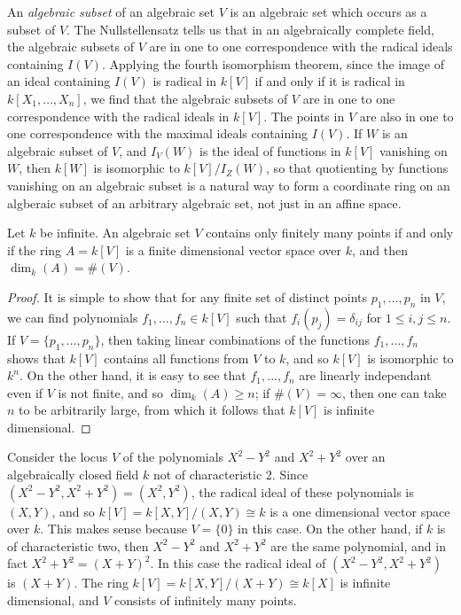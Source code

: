 An \emph{algebraic subset} of an algebraic set $V$ is an algebraic set which occurs as a subset of $V$. The Nullstellensatz tells us that in an algebraically complete field, the algebraic subsets of $V$ are in one to one correspondence with the radical ideals containing $I(V)$. Applying the fourth isomorphism theorem, since the image of an ideal containing $I(V)$ is radical in $k[V]$ if and only if it is radical in $k[X_1,\dots,X_n]$, we find that the algebraic subsets of $V$ are in one to one correspondence with the radical ideals in $k[V]$. The points in $V$ are also in one to one correspondence with the maximal ideals containing $I(V)$. If $W$ is an algebraic subset of $V$, and $I_V(W)$ is the ideal of functions in $k[V]$ vanishing on $W$, then $k[W]$ is isomorphic to $k[V]/I_Z(W)$, so that quotienting by functions vanishing on an algebraic subset is a natural way to form a coordinate ring on an algberaic subset of an arbitrary algebraic set, not just in an affine space.

\begin{prop}
    Let $k$ be infinite. An algebraic set $V$ contains only finitely many points if and only if the ring $A = k[V]$ is a finite dimensional vector space over $k$, and then $\dim_k(A) = \#(V)$.
\end{prop}
\begin{proof}
    It is simple to show that for any finite set of distinct points $p_1,\dots,p_n$ in $V$, we can find polynomials $f_1,\dots,f_n \in k[V]$ such that $f_i(p_j) = \delta_{ij}$ for $1 \leq i,j \leq n$. If $V = \{ p_1,\dots,p_n \}$, then taking linear combinations of the functions $f_1,\dots,f_n$ shows that $k[V]$ contains all functions from $V$ to $k$, and so $k[V]$ is isomorphic to $k^n$. On the other hand, it is easy to see that $f_1,\dots,f_n$ are linearly independant even if $V$ is not finite, and so $\dim_k(A) \geq n$; if $\#(V) = \infty$, then one can take $n$ to be arbitrarily large, from which it follows that $k[V]$ is infinite dimensional.
\end{proof}

\begin{example}
    Consider the locus $V$ of the polynomials $X^2 - Y^2$ and $X^2 + Y^2$ over an algebraically closed field $k$ not of characteristic 2. Since $(X^2 - Y^2, X^2 + Y^2) = (X^2,Y^2)$, the radical ideal of these polynomials is $(X,Y)$, and so $k[V] = k[X,Y]/(X,Y) \cong k$ is a one dimensional vector space over $k$. This makes sense because $V = \{ 0 \}$ in this case.  On the other hand, if $k$ is of characteristic two, then $X^2 - Y^2$ and $X^2 + Y^2$ are the same polynomial, and in fact $X^2 + Y^2 = (X + Y)^2$. In this case the radical ideal of $(X^2 - Y^2, X^2 + Y^2)$ is $(X + Y)$. The ring $k[V] = k[X,Y]/(X+Y) \cong k[X]$ is infinite dimensional, and $V$ consists of infinitely many points.
\end{example}

